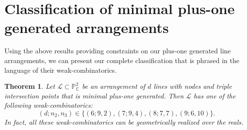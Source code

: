 \documentclass[12pt]{article}
\theoremstyle{plain}
\newtheorem{theorem}[thm]{Theorem}
\theoremstyle{definition}
\begin{document}
\section{Classification of minimal plus-one generated arrangements}
Using the above results providing constraints on our plus-one generated line arrangements, we can present our complete classification that is phrased in the language of their weak-combinatorics.
\begin{theorem}
Let $\mathcal{L}\subset \mathbb{P}^{2}_{\mathbb{C}}$ be an arrangement of $d$ lines with nodes and triple intersection points that is minimal plus-one generated. Then $\mathcal{L}$ has one of the following weak-combinatorics: 
$$(d;n_{2},n_{3}) \in \{(6;9,2),(7;9,4),(8;7,7),(9;6,10)\}.$$
In fact, all these weak-combinatorics can be geometrically realized over the reals.
\end{theorem}
\end{document}
